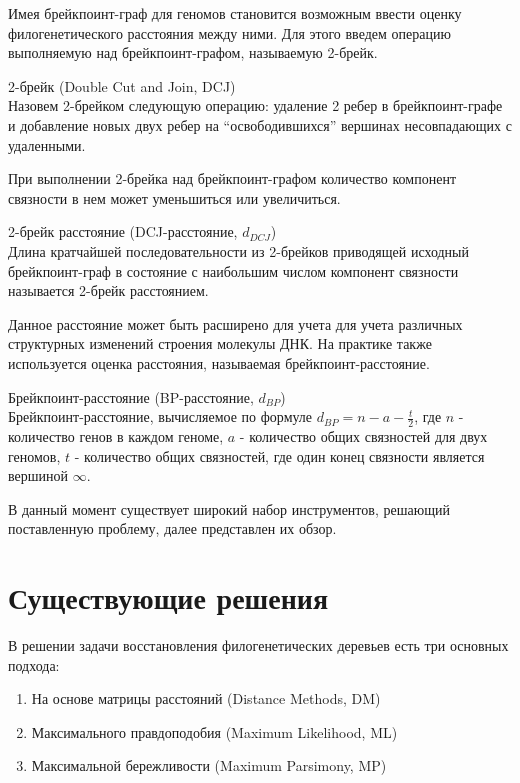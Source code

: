 Имея брейкпоинт-граф для геномов становится возможным ввести оценку филогенетического расстояния между ними.
Для этого введем операцию выполняемую над брейкпоинт-графом, называемую 2-брейк.
\begin{define}{2-брейк (Double Cut and Join, DCJ)} \\
  Назовем 2-брейком следующую операцию: удаление 2 ребер в брейкпоинт-графе и добавление новых двух ребер на ``освободившихся'' вершинах
  несовпадающих с удаленными.
\end{define}
При выполнении 2-брейка над брейкпоинт-графом количество компонент связности в нем может уменьшиться или увеличиться.
\begin{define}{2-брейк расстояние (DCJ-расстояние, $d_{DCJ}$)} \\
  Длина кратчайшей последовательности из 2-брейков приводящей исходный брейкпоинт-граф в состояние с наибольшим числом компонент связности
  называется 2-брейк расстоянием.
\end{define}

Данное расстояние может быть расширено для учета для учета различных структурных изменений строения молекулы ДНК.
На практике также используется оценка расстояния, называемая брейкпоинт-расстояние.

\begin{define}{Брейкпоинт-расстояние (BP-расстояние, $d_{BP}$)} \\
  Брейкпоинт-расстояние, вычисляемое по формуле $d_{BP} = n - a - \frac{t}{2}$,
  где $n$ - количество генов в каждом геноме,
  $a$ - количество общих связностей для двух геномов, $t$ - количество
  общих связностей, где один конец связности является вершиной $\infty$.
\end{define}

В данный момент существует широкий набор инструментов, решающий поставленную проблему,
далее представлен их обзор.

\section{Существующие решения}

В решении задачи восстановления филогенетических деревьев есть три основных подхода:
\begin{enumerate}
  \item На основе матрицы расстояний (Distance Methods, DM)
  \item Максимального правдоподобия (Maximum Likelihood, ML)
  \item Максимальной бережливости (Maximum Parsimony, MP)
\end{enumerate}

